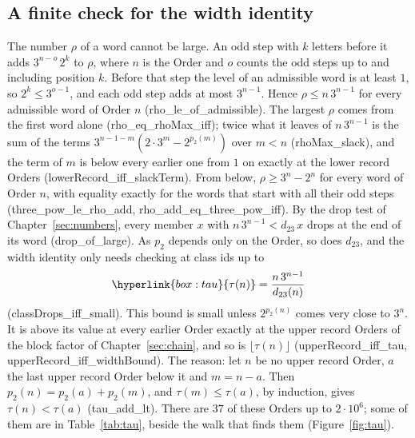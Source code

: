 \documentclass[11pt,a4paper,titlepage]{article}
\makeatletter
\newcommand{\termhere}[1]{\leavevmode
  \Hy@raisedlink{\hyper@anchorstart{term:#1}\hyper@anchorend}}
\newcommand{\keysym}[2]{\hyperlink{box:#1}{#2}}
\newcommand{\lean}[1]{\textsf{#1}}
\makeatother
\begin{document}
\subsection*{A finite check for the width identity}

The number $\rho$ of a word cannot be large. An odd step with $k$ letters before it adds
$3^{n-o}\,2^k$ to $\rho$, where $n$ is the Order and $o$ counts the odd steps up to
and including position $k$. Before that step the level of an admissible word is
at least $1$, so $2^k \le 3^{o-1}$, and each odd step adds at most $3^{n-1}$. Hence
$\rho \le n\,3^{n-1}$ for every admissible word of Order $n$
(\lean{rho\_le\_of\_admissible}). The largest $\rho$ comes from the first word alone
(\lean{rho\_eq\_rhoMax\_iff}); twice what it leaves of $n\,3^{n-1}$ is the sum of the terms
$3^{n-1-m}(2 \cdot 3^m - 2^{p_2(m)})$ over $m < n$ (\lean{rhoMax\_slack}), and the term of $m$
is below every earlier one from $1$ on exactly at the lower record Orders
(\lean{lowerRecord\_iff\_slackTerm}). From below, $\rho \ge 3^n - 2^n$ for every word of
Order $n$, with equality exactly for the words that start with all their odd steps
(\lean{three\_pow\_le\_rho\_add}, \lean{rho\_add\_eq\_three\_pow\_iff}). \termhere{tau}By the drop test of Chapter~\ref{sec:numbers},
every member $x$ with $n\,3^{n-1} < d_{23}\,x$ drops at the end of its word
(\lean{drop\_of\_large}). As $p_2$ depends only on the Order, so does $d_{23}$,
and the width identity only needs checking at class ids up to
\[
\keysym{tau}{\tau(n)} = \frac{n\,3^{n-1}}{d_{23}(n)}
\]
(\lean{classDrops\_iff\_small}). This bound is small unless $2^{p_2(n)}$ comes
very close to $3^n$. It is above its value at every earlier Order exactly at the
upper record Orders of the block factor of Chapter~\ref{sec:chain}, and so is
$\lfloor \tau(n) \rfloor$ (\lean{upperRecord\_iff\_tau},
\lean{upperRecord\_iff\_widthBound}). The reason: let $n$ be no upper record Order, $a$
the last upper record Order below it and $m = n - a$. Then $p_2(n) = p_2(a) + p_2(m)$,
and $\tau(m) \le \tau(a)$, by induction, gives $\tau(n) < \tau(a)$ (\lean{tau\_add\_lt}). There are
$37$ of these Orders up to $2\cdot 10^6$; some of them are in Table~\ref{tab:tau},
beside the walk that finds them (Figure~\ref{fig:tau}).
\end{document}
